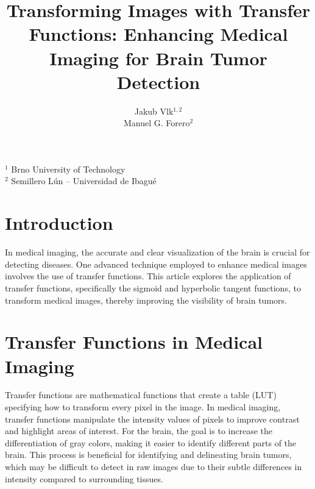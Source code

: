 \documentclass[a4paper]{article}
\title{Transforming Images with Transfer Functions: Enhancing Medical Imaging for Brain Tumor Detection}
\author{Jakub Vlk$^{1,2}$ \\ Manuel G. Forero$^2$ }
\date{}
\begin{document}
\maketitle

\begin{center}
    
\quad $^1$ Brno University of Technology \\
\quad $^2$ Semillero L{\'{u}}n -- Universidad de Ibagué
\end{center}

\section{Introduction}

In medical imaging, the accurate and clear visualization of the brain is crucial for detecting diseases. One advanced technique employed to enhance medical images involves the use of transfer functions. This article explores the application of transfer functions, specifically the sigmoid and hyperbolic tangent functions, to transform medical images, thereby improving the visibility of brain tumors.

\section{Transfer Functions in Medical Imaging}

Transfer functions are mathematical functions that create a table (LUT) specifying how to transform every pixel in the image. In medical imaging, transfer functions manipulate the intensity values of pixels to improve contrast and highlight areas of interest. For the brain, the goal is to increase the differentiation of gray colors, making it easier to identify different parts of the brain. This process is beneficial for identifying and delineating brain tumors, which may be difficult to detect in raw images due to their subtle differences in intensity compared to surrounding tissues.
\end{document}
